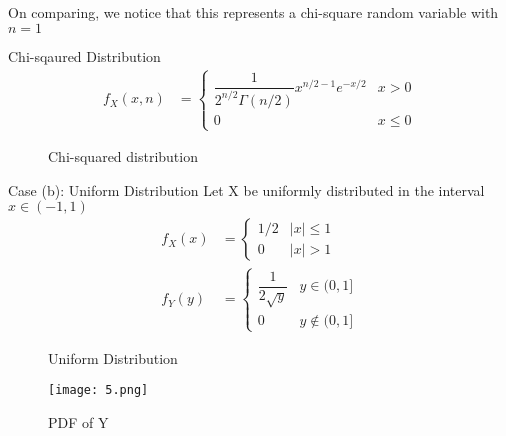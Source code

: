 \documentclass{beamer}
\begin{document}
\begin{frame}
\begin{block}{}
On comparing, we notice that this represents a chi-square random variable with $n=1$
\end{block}
\begin{exampleblock}{Chi-sqaured Distribution}
\begin{align}
f_X(x,n)&=\begin{cases}
					\dfrac{1}{2^{n/2}\Gamma(n/2)}x^{n/2-1}e^{-x/2}&x>0\\
					0&x\leq0
					\end{cases}
\end{align}
\end{exampleblock}
\end{frame}
\begin{frame}
\begin{figure}[!tbp]
  \centering
  \hfill
  \caption{Chi-squared distribution}
\end{figure}
\end{frame}
\begin{frame}
\begin{block}{Case (b): Uniform Distribution}
Let X be uniformly distributed in the interval $x\in(-1,1)$\\
\begingroup
\addtolength{\jot}{.1in}
\begin{align}
f_X(x)&=\begin{cases}
				 1/2&|x|\leq1\\
				 0&|x|>1
				 \end{cases}\\
f_Y(y)&=\begin{cases}
				 \dfrac{1}{2\sqrt{y}}&y\in(0,1]\\
				 0&y\notin(0,1]
				 \end{cases}
\end{align}
\endgroup
\end{block}
\end{frame}
\begin{frame}
\begin{figure}[!tbp]
  \centering
  \hfill
  \caption{Uniform Distribution}
\end{figure}
\end{frame}
\begin{frame}
\begin{figure}[!tbp]
\centering
\texttt{[image: 5.png]}
\caption{PDF of Y}
\label{fig:f6}
\end{figure}
\end{frame}
\end{document}
